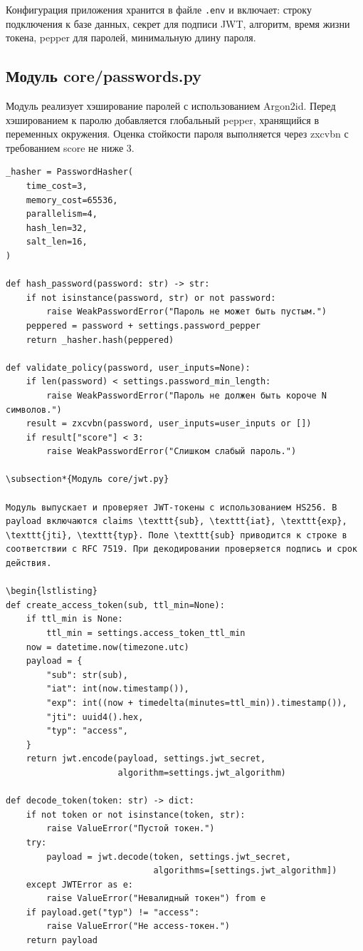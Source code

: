 \documentclass[oneside,a4paper,14pt]{extarticle}
\begin{document}
Конфигурация приложения хранится в файле \texttt{.env} и включает: строку подключения к базе данных, секрет для подписи JWT, алгоритм, время жизни токена, pepper для паролей, минимальную длину пароля.

\subsection*{Модуль core/passwords.py}

Модуль реализует хэширование паролей с использованием Argon2id. Перед хэшированием к паролю добавляется глобальный pepper, хранящийся в переменных окружения. Оценка стойкости пароля выполняется через zxcvbn с требованием score не ниже 3.

\begin{lstlisting}
_hasher = PasswordHasher(
    time_cost=3,
    memory_cost=65536,
    parallelism=4,
    hash_len=32,
    salt_len=16,
)

def hash_password(password: str) -> str:
    if not isinstance(password, str) or not password:
        raise WeakPasswordError("Пароль не может быть пустым.")
    peppered = password + settings.password_pepper
    return _hasher.hash(peppered)

def validate_policy(password, user_inputs=None):
    if len(password) < settings.password_min_length:
        raise WeakPasswordError("Пароль не должен быть короче N символов.")
    result = zxcvbn(password, user_inputs=user_inputs or [])
    if result["score"] < 3:
        raise WeakPasswordError("Слишком слабый пароль.")

\subsection*{Модуль core/jwt.py}

Модуль выпускает и проверяет JWT-токены с использованием HS256. В payload включаются claims \texttt{sub}, \texttt{iat}, \texttt{exp}, \texttt{jti}, \texttt{typ}. Поле \texttt{sub} приводится к строке в соответствии с RFC 7519. При декодировании проверяется подпись и срок действия.

\begin{lstlisting}
def create_access_token(sub, ttl_min=None):
    if ttl_min is None:
        ttl_min = settings.access_token_ttl_min
    now = datetime.now(timezone.utc)
    payload = {
        "sub": str(sub),
        "iat": int(now.timestamp()),
        "exp": int((now + timedelta(minutes=ttl_min)).timestamp()),
        "jti": uuid4().hex,
        "typ": "access",
    }
    return jwt.encode(payload, settings.jwt_secret,
                      algorithm=settings.jwt_algorithm)

def decode_token(token: str) -> dict:
    if not token or not isinstance(token, str):
        raise ValueError("Пустой токен.")
    try:
        payload = jwt.decode(token, settings.jwt_secret,
                             algorithms=[settings.jwt_algorithm])
    except JWTError as e:
        raise ValueError("Невалидный токен") from e
    if payload.get("typ") != "access":
        raise ValueError("Не access-токен.")
    return payload
\end{lstlisting}
\end{document}
